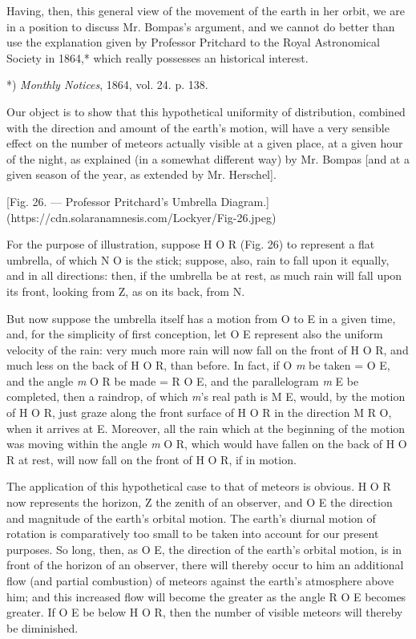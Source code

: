 \documentclass[a4paper, 12pt, oneside, polutonikogreek, english]{article}
\begin{document}
Having, then, this general view of the movement of the earth in her orbit, we are in a position to discuss Mr. Bompas's argument, and we cannot do better than use the explanation given by Professor Pritchard to the Royal Astronomical Society in 1864,* which really possesses an historical interest.

*) \emph{Monthly Notices}, 1864, vol. 24. p. 138.

Our object is to show that this hypothetical uniformity of distribution, combined with the direction and amount of the earth's motion, will have a very sensible effect on the number of meteors actually visible at a given place, at a given hour of the night, as explained (in a somewhat different way) by Mr. Bompas [and at a given season of the year, as extended by Mr. Herschel].

[Fig. 26. --- Professor Pritchard's Umbrella Diagram.](https://cdn.solaranamnesis.com/Lockyer/Fig-26.jpeg)

For the purpose of illustration, suppose H O R (Fig. 26) to represent a flat umbrella, of which N O is the stick; suppose, also, rain to fall upon it equally, and in all directions: then, if the umbrella be at rest, as much rain will fall upon its front, looking from Z, as on its back, from N.

But now suppose the umbrella itself has a motion from O to E in a given time, and, for the simplicity of first conception, let O E represent also the uniform velocity of the rain: very much more rain will now fall on the front of H O R, and much less on the back of H O R, than before. In fact, if O \emph{m} be taken = O E, and the angle \emph{m} O R be made = R O E, and the parallelogram \emph{m} E be completed, then a raindrop, of which \emph{m}'s real path is M E, would, by the motion of H O R, just graze along the front surface of H O R in the direction M R O, when it arrives at E. Moreover, all the rain which at the beginning of the motion was moving within the angle \emph{m} O R, which would have fallen on the back of H O R at rest, will now fall on the front of H O R, if in motion.

The application of this hypothetical case to that of meteors is obvious. H O R now represents the horizon, Z the zenith of an observer, and O E the direction and magnitude of the earth's orbital motion. The earth's diurnal motion of rotation is comparatively too small to be taken into account for our present purposes. So long, then, as O E, the direction of the earth's orbital motion, is in front of the horizon of an observer, there will thereby occur to him an additional flow (and partial combustion) of meteors against the earth's atmosphere above him; and this increased flow will become the greater as the angle R O E becomes greater. If O E be below H O R, then the number of visible meteors will thereby be diminished.
\end{document}
